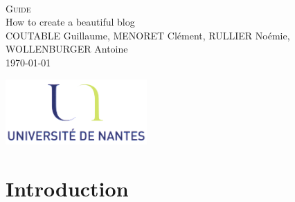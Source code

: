 \documentclass[a4paper,10pt]{article}
\begin{document}
\fancyhead[LE,CE,RE,LO,CO,RO]{}
\fancyfoot[LE,CE,RE,LO,CO,RO]{}
\renewcommand{\headrulewidth}{0.4pt}
\renewcommand{\footrulewidth}{0.4pt}

\begin{titlepage}

\vspace*{\fill}~
\begin{center}
{\large \textsc{Guide}} \\
\vspace{1cm}
{\LARGE How to create a beautiful blog} \\
\vspace{1cm}
COUTABLE Guillaume, MENORET Clément, RULLIER Noémie, WOLLENBURGER Antoine \\
\today
\end{center}
\vspace*{\fill}

\begin{center}
\noindent 
\includegraphics[height=2.5cm]{Images/universite.png}
\end{center}
\pagebreak
\end{titlepage}

\newpage
\tableofcontents 

\newpage
\pagestyle{fancy}


\section{Introduction}
\end{document}
